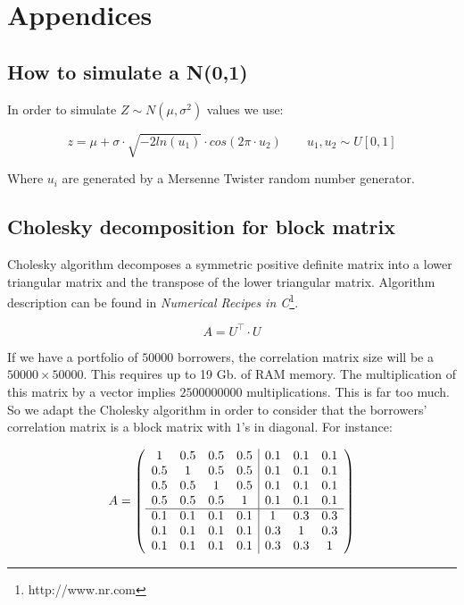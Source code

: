 \documentclass[a4paper,12pt,final]{article}
\begin{document}
\appendix
\section{Appendices}

\subsection{How to simulate a N(0,1)}
\label{ap:normsim}

In order to simulate $Z \sim N(\mu, \sigma^2)$ values we use:

\begin{displaymath}
z = \mu + \sigma\cdot \sqrt{-2 ln(u_1)} \cdot cos(2 \pi \cdot u_2)
\qquad u_1, u_2 \sim U[0,1]
\end{displaymath}

Where $u_i$ are generated by a Mersenne Twister random number generator.

\subsection{Cholesky decomposition for block matrix}
\label{ap:cholblock}

Cholesky algorithm decomposes a symmetric positive definite matrix into a lower
triangular matrix and the transpose of the lower triangular matrix. Algorithm 
description can be found in \emph{Numerical Recipes in C}\footnote{http://www.nr.com}.

\begin{displaymath}
A = U^{\top} \cdot U
\end{displaymath}

If we have a portfolio of $50000$ borrowers, the correlation matrix size will
be a $50000 \times 50000$. This requires up to 19 Gb. of RAM memory. The 
multiplication of this matrix by a vector implies $2500000000$ multiplications.
This is far too much. So we adapt the Cholesky algorithm in order to consider that 
the borrowers' correlation matrix is a block matrix with $1$'s in diagonal. 
For instance:

\begin{displaymath}
A = \left(
\begin{array}{cccc|ccc}
1   & 0.5 & 0.5 & 0.5 & 0.1 & 0.1 & 0.1 \cr
0.5 & 1   & 0.5 & 0.5 & 0.1 & 0.1 & 0.1 \cr
0.5 & 0.5 & 1   & 0.5 & 0.1 & 0.1 & 0.1 \cr
0.5 & 0.5 & 0.5 & 1   & 0.1 & 0.1 & 0.1 \cr
\hline
0.1 & 0.1 & 0.1 & 0.1 & 1   & 0.3 & 0.3 \cr
0.1 & 0.1 & 0.1 & 0.1 & 0.3 & 1   & 0.3 \cr
0.1 & 0.1 & 0.1 & 0.1 & 0.3 & 0.3 & 1
\end{array}
\right)
\end{displaymath}
\end{document}
